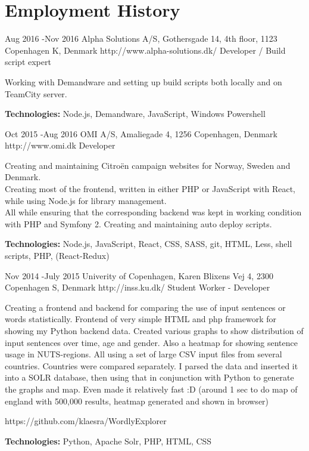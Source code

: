 \documentclass[10pt]{article} %
\begin{document}
\section{Employment History}

\job
{Aug 2016 -}{Nov 2016}
{Alpha Solutions A/S, Gothersgade 14, 4th floor, 1123 Copenhagen K, Denmark}
{http://www.alpha-solutions.dk/}
{Developer / Build script expert}
{Working with Demandware and setting up build scripts both locally and on TeamCity server.\\
\rule{0mm}{5mm}\textbf{Technologies:} Node.js, Demandware, JavaScript, Windows Powershell}


\job
{Oct 2015 -}{Aug 2016}
{OMI A/S, Amaliegade 4, 1256 Copenhagen, Denmark}
{http://www.omi.dk}
{Developer}
{Creating and maintaining Citroën campaign websites for Norway, Sweden and Denmark.\\
Creating most of the frontend, written in either PHP or JavaScript with React, while using Node.js 
for library management.\\
All while ensuring that the corresponding backend was kept in working condition with PHP and Symfony 2. 
Creating and maintaining auto deploy scripts.\\
\rule{0mm}{5mm}\textbf{Technologies:} Node.js, JavaScript, React, CSS, SASS, git, HTML, Less, shell scripts, PHP, (React-Redux)}

\job
{Nov 2014 -}{July 2015}
{Univerity of Copenhagen, Karen Blixens Vej 4, 2300 Copenhagen S, Denmark}
{http://inss.ku.dk/}
{Student Worker - Developer}
{Creating a frontend and backend for comparing the use of input sentences or words statistically. 
Frontend of very simple HTML and php framework for showing my Python backend data.
Created various graphs to show distribution of input sentences over time, age and gender. 
Also a heatmap for showing sentence usage in NUTS-regions. All using a set of large CSV input files from several countries. 
Countries were compared separately. 
I parsed the data and inserted it into a SOLR database, then using that in conjunction with Python to generate the graphs and map. 
Even made it relatively fast :D (around 1 sec to do map of england with 500,000 results, heatmap generated and shown in browser)

https://github.com/klaesra/WordlyExplorer \\
\rule{0mm}{5mm}\textbf{Technologies:} Python, Apache Solr, PHP, HTML, CSS}
\end{document}
